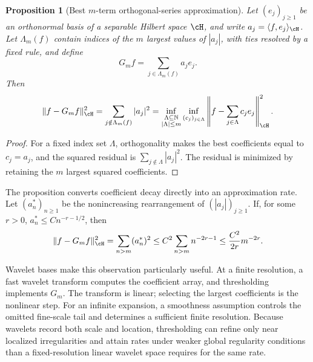 \documentclass[11pt,twoside]{article}
\newtheorem{proposition}[theorem]{Proposition}
\theoremstyle{definition}
\theoremstyle{remark}
\begin{document}
\begin{proposition}[Best \(m\)-term orthogonal-series approximation]
\label{prop:best-m-term-orthogonal}
Let \((e_j)_{j\geq1}\) be an orthonormal basis of a separable Hilbert space
\(\cH\), and write \(a_j=\langle f,e_j\rangle_{\cH}\). Let
\(\Lambda_m(f)\) contain indices of the \(m\) largest values of \(|a_j|\),
with ties resolved by a fixed rule, and define
\begin{equation}
 G_mf=\sum_{j\in\Lambda_m(f)}a_je_j.
 \label{eq:orthogonal-thresholding}
\end{equation}
Then
\begin{equation}
 \|f-G_mf\|_{\cH}^2
 =\sum_{j\notin\Lambda_m(f)}|a_j|^2
 =\inf_{\substack{\Lambda\subseteq\mathbb N\\|\Lambda|\leq m}}
   \inf_{(c_j)_{j\in\Lambda}}
   \left\|f-\sum_{j\in\Lambda}c_je_j\right\|_{\cH}^2.
 \label{eq:best-m-term-orthogonal}
\end{equation}
\end{proposition}

\begin{proof}
For a fixed index set \(\Lambda\), orthogonality makes the best coefficients
equal to \(c_j=a_j\), and the squared residual is
\(\sum_{j\notin\Lambda}|a_j|^2\). The residual is minimized by retaining the
\(m\) largest squared coefficients.
\end{proof}

The proposition converts coefficient decay directly into an approximation
rate. Let \((a_n^*)_{n\geq1}\) be the nonincreasing rearrangement of
\((|a_j|)_{j\geq1}\). If, for some \(r>0\),
\(a_n^*\leq Cn^{-r-1/2}\), then
\[
 \|f-G_mf\|_{\cH}^2
 =\sum_{n>m}(a_n^*)^2
 \leq C^2\sum_{n>m}n^{-2r-1}
 \leq\frac{C^2}{2r}m^{-2r}.
\]

Wavelet bases make this observation particularly useful. At a finite
resolution, a fast wavelet transform computes the coefficient array, and
thresholding implements \(G_m\). The transform is linear; selecting the
largest coefficients is the nonlinear step. For an infinite expansion, a
smoothness assumption controls the omitted fine-scale tail and determines a
sufficient finite resolution. Because wavelets record both scale and location,
thresholding can refine only near localized irregularities and attain rates
under weaker global regularity conditions than a fixed-resolution linear
wavelet space requires for the same rate.
\end{document}
